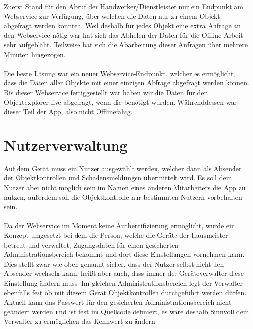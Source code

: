 \documentclass[12pt]{article}
\begin{document}
\paragraph{}Zuerst Stand für den Abruf der Handwerker/Dienstleister nur ein Endpunkt am Webservice zur Verfügung, über welchen die Daten nur zu einem Objekt abgefragt werden konnten. Weil deshalb für jedes Objekt eine extra Anfrage an den Webservice nötig war hat sich das Abholen der Daten für die Offline-Arbeit sehr aufgebläht. Teilweise hat sich die Abarbeitung dieser Anfragen über mehrere Minuten hingezogen.

\paragraph{}Die beste Lösung war ein neuer Webservice-Endpunkt, welcher es ermöglicht, dass die Daten aller Objekte mit einer einzigen Abfrage abgefragt werden können. Bis dieser Webservice fertiggestellt war haben wir die Daten für den Objektexplorer live abgefragt, wenn die benötigt wurden. Währenddessen war dieser Teil der App, also nicht Offlinefähig.

\section{Nutzerverwaltung}
Auf dem Gerät muss ein Nutzer ausgewählt werden, welcher dann als Absender der Objektkontrollen und Schadensmeldungen übermittelt wird. Es soll dem Nutzer aber nicht möglich sein im Namen eines anderen Mitarbeiters die App zu nutzen, außerdem soll die Objektkontrolle nur bestimmten Nutzern vorbehalten sein.

\paragraph{}Da der Webservice im Moment keine Authentifizierung ermöglicht, wurde ein Konzept umgesetzt bei dem die Person, welche die Geräte der Hausmeister betreut und verwaltet, Zugangsdaten für einen gesicherten Administrationsbereich bekommt und dort diese Einstellungen vornehmen kann. Dies stellt zwar wie oben genannt sicher, dass der Nutzer selbst nicht den Absender wechseln kann, heißt aber auch, dass immer der Geräteverwalter diese Einstellung ändern muss. Im gleichen Administrationsbereich legt der Verwalter ebenfalls fest ob mit diesem Gerät Objektkontrollen durchgeführt werden dürfen. Aktuell kann das Passwort für den gesicherten Administrationsbereich nicht geändert werden und ist fest im Quellcode definiert, es wäre deshalb Sinnvoll dem Verwalter zu ermöglichen das Kennwort zu ändern.
\end{document}
